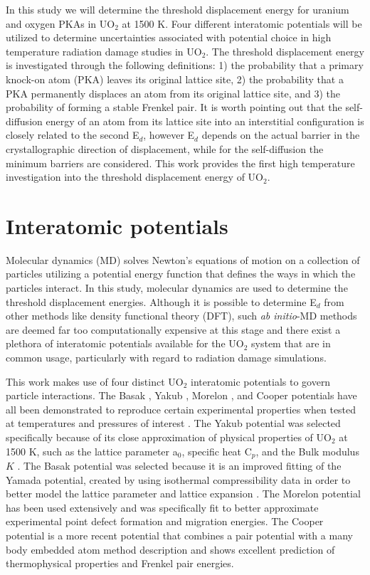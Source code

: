 \documentclass[review]{elsarticle}
\begin{document}
In this study we will determine the threshold displacement energy for uranium and oxygen PKAs in UO$_2$ at 1500 K. Four different interatomic potentials will be utilized to determine uncertainties associated with potential choice in high temperature radiation damage studies in UO$_2$. The threshold displacement energy is investigated through the following definitions: 1) the probability that a primary knock-on atom (PKA) leaves its original lattice site, 2) the probability that a PKA permanently displaces an atom from its original lattice site, and 3) the probability of forming a stable Frenkel pair. It is worth pointing out that the self-diffusion energy of an atom from its lattice site into an interstitial configuration is closely related to the second E$_d$, however E$_d$ depends on the actual barrier in the crystallographic direction of displacement, while for the self-diffusion the minimum barriers are considered. This work provides the first high temperature investigation into the threshold displacement energy of UO$_2$.

\section{Interatomic potentials}

\hspace{5mm}
Molecular dynamics (MD) solves Newton's equations of motion on a collection of particles utilizing a potential energy function that defines the ways in which the particles interact. In this study, molecular dynamics are used to determine the threshold displacement energies. Although it is possible to determine E$_d$ from other methods like density functional theory (DFT), such \textit{ab initio}-MD methods are deemed far too computationally expensive at this stage and there exist a plethora of interatomic potentials available for the UO$_2$ system that are in common usage, particularly with regard to radiation damage simulations.

This work makes use of four distinct UO$_2$ interatomic potentials to govern particle interactions. The Basak \cite{basak}, Yakub \cite{yakub}, Morelon \cite{morelon2003}, and Cooper \cite{cooper} potentials have all been demonstrated to reproduce certain experimental properties when tested at temperatures and pressures of interest \cite{govers1,govers2,potashnikov}. The Yakub potential was selected specifically because of its close approximation of physical properties of UO$_2$ at 1500 K, such as the lattice parameter a$_0$, specific heat C$_p$, and the Bulk modulus $K$ \cite{govers2}. The Basak potential was selected because it is an improved fitting of the Yamada potential, created by using isothermal compressibility data in order to better model the lattice parameter and lattice expansion \cite{basak}. The Morelon potential has been used extensively and was specifically fit to better approximate experimental point defect formation and migration energies. The Cooper potential is a more recent potential that combines a pair potential with a many body embedded atom method description and shows excellent prediction of thermophysical properties and Frenkel pair energies.
\end{document}
